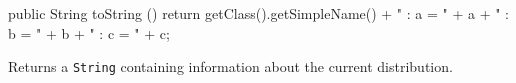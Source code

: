 \begin{hide}\begin{code}

   public String toString () {
      return getClass().getSimpleName() + " : a = " + a + " : b = " + b + " : c = " + c;
   }
\end{code}
\begin{tabb}
   Returns a \texttt{String} containing information about the current distribution.
\end{tabb}
\begin{htmlonly}
\end{htmlonly}\end{hide}
\begin{code}\begin{hide}
}\end{hide}
\end{code}
